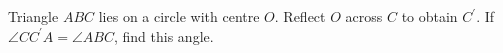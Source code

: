 Triangle $ABC$ lies on a circle with centre $O$. Reflect $O$ across $C$ to obtain $C^{\prime}$. If $\angle CC^{\prime}A=\angle ABC$, find this angle.
